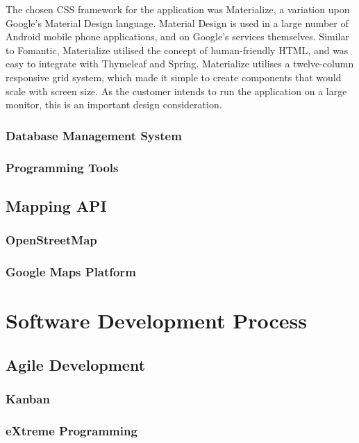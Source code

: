 The chosen CSS framework for the application was Materialize, a variation upon Google's Material Design language. Material Design is used in a large number of Android mobile phone applications, and on Google's services themselves. Similar to Fomantic, Materialize utilised the concept of human-friendly HTML, and was easy to integrate with Thymeleaf and Spring. Materialize utilises a twelve-column responsive grid system, which made it simple to create components that would scale with screen size. As the customer intends to run the application on a large monitor, this is an important design consideration.

\subsubsection{Database Management System}

\subsubsection{Programming Tools}

\subsection{Mapping API}

\subsubsection{OpenStreetMap}

\subsubsection{Google Maps Platform}

\section{Software Development Process}

\subsection{Agile Development}

\subsubsection{Kanban}

\subsubsection{eXtreme Programming}

